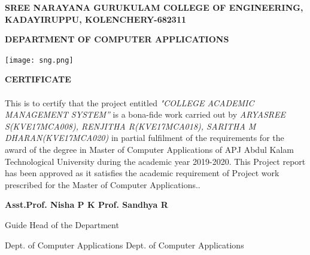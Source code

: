 \documentclass[a4paper, 12pt]{report}
\begin{document}
\newpage
\begin{titlepage}
	{\fontsize{16pt}{16pt}\selectfont\bfseries\center SREE NARAYANA GURUKULAM COLLEGE OF ENGINEERING, KADAYIRUPPU, KOLENCHERY-682311\par}
	{\fontsize{14pt}{14pt}\selectfont\bfseries\center DEPARTMENT OF COMPUTER APPLICATIONS\par}
	\begin{center}
\texttt{[image: sng.png]}\par
     \end{center}
	{\fontsize{16pt}{16pt}\selectfont\bfseries\center CERTIFICATE \par}
\paragraph{}{\fontsize{14pt}{14pt}\selectfont  This is to certify that the project entitled \textit{"COLLEGE ACADEMIC MANAGEMENT SYSTEM''}  is a bona-fide work carried out by \textit{ ARYASREE S(KVE17MCA008), RENJITHA R(KVE17MCA018), SARITHA M DHARAN(KVE17MCA020)}   in partial fulfilment
of the requirements for the award of the degree in Master of Computer Applications of APJ Abdul Kalam Technological University during the academic year 2019-2020. This Project report has been approved
as it satisfies the academic requirement of Project work prescribed for the Master of Computer
Applications..}
\\\vspace{1.5cm}

{\fontsize{14pt}{14pt}\selectfont\bfseries Asst.Prof. Nisha P K\hspace{125pt} Prof. Sandhya R\par}
	 {\fontsize{14pt}{14pt}\selectfont Guide \hspace{235pt} Head of the Department	\par}
  {\fontsize{14pt}{14pt}\selectfont Dept. of Computer Applications\hspace{85pt}  Dept. of Computer Applications\par}
    {\fontsize{14pt}{14pt}\selectfont  \hspace{200pt} \par}
 \vspace{1cm}

	
\end{titlepage}
\end{document}
